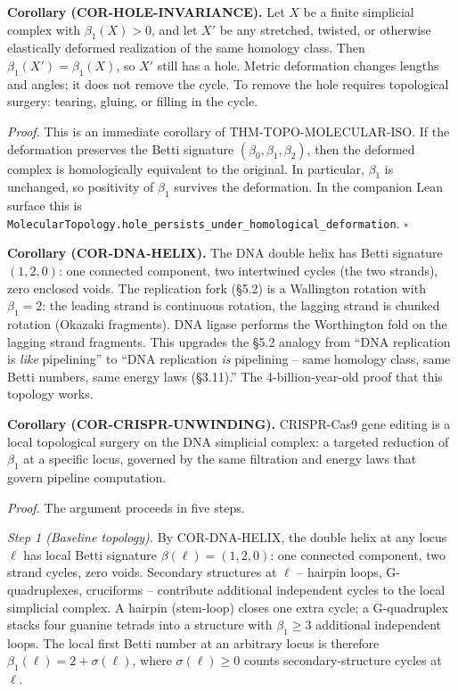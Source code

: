 \documentclass[
  11pt,
]{article}
\begin{document}
\textbf{Corollary (COR-HOLE-INVARIANCE).} Let \(X\) be a finite
simplicial complex with \(\beta_1(X) > 0\), and let \(X'\) be any
stretched, twisted, or otherwise elastically deformed realization of the
same homology class. Then \(\beta_1(X') = \beta_1(X)\), so \(X'\) still
has a hole. Metric deformation changes lengths and angles; it does not
remove the cycle. To remove the hole requires topological surgery:
tearing, gluing, or filling in the cycle.

\emph{Proof.} This is an immediate corollary of THM-TOPO-MOLECULAR-ISO.
If the deformation preserves the Betti signature
\((\beta_0, \beta_1, \beta_2)\), then the deformed complex is
homologically equivalent to the original. In particular, \(\beta_1\) is
unchanged, so positivity of \(\beta_1\) survives the deformation. In the
companion Lean surface this is
\texttt{MolecularTopology.\allowbreak{}hole\_persists\_under\_homological\_deformation}.
\(\square\)

\textbf{Corollary (COR-DNA-HELIX).} The DNA double helix has Betti
signature \((1, 2, 0)\): one connected component, two intertwined cycles
(the two strands), zero enclosed voids. The replication fork (§5.2) is a
Wallington rotation with \(\beta_1 = 2\): the leading strand is
continuous rotation, the lagging strand is chunked rotation (Okazaki
fragments). DNA ligase performs the Worthington fold on the lagging
strand fragments. This upgrades the §5.2 analogy from ``DNA replication
is \emph{like} pipelining'' to ``DNA replication \emph{is} pipelining --
same homology class, same Betti numbers, same energy laws (§3.11).'' The
4-billion-year-old proof that this topology works.

\textbf{Corollary (COR-CRISPR-UNWINDING).} CRISPR-Cas9 gene editing is a
local topological surgery on the DNA simplicial complex: a targeted
reduction of \(\beta_1\) at a specific locus, governed by the same
filtration and energy laws that govern pipeline computation.

\emph{Proof.} The argument proceeds in five steps.

\emph{Step 1 (Baseline topology).} By COR-DNA-HELIX, the double helix at
any locus \(\ell\) has local Betti signature
\(\beta(\ell) = (1, 2, 0)\): one connected component, two strand cycles,
zero voids. Secondary structures at \(\ell\) -- hairpin loops,
G-quadruplexes, cruciforms -- contribute additional independent cycles
to the local simplicial complex. A hairpin (stem-loop) closes one extra
cycle; a G-quadruplex stacks four guanine tetrads into a structure with
\(\beta_1 \geq 3\) additional independent loops. The local first Betti
number at an arbitrary locus is therefore
\(\beta_1(\ell) = 2 + \sigma(\ell)\), where \(\sigma(\ell) \geq 0\)
counts secondary-structure cycles at \(\ell\).
\end{document}
